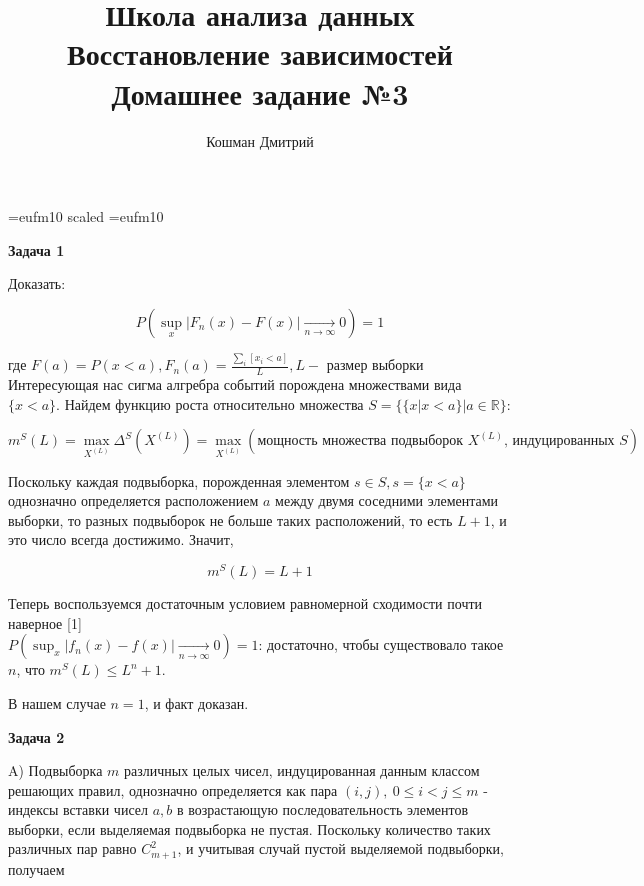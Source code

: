 \documentclass[10pt]{article}
\title{Школа анализа данных\\ Восстановление зависимостей \\Домашнее задание №3}
\author{Кошман Дмитрий}
\date{}
\begin{document}
	
	
	\voffset=-20mm
	\hoffset=-17mm
	\font\Got=eufm10 scaled \font\Got=eufm10
	
	
	\maketitle
	
\bigskip

\textbf{Задача 1}

\medskip

Доказать:

$$P\left(\sup_x \left| F_n(x) -F(x) \right|  \xrightarrow[n\rightarrow \infty]{} 0 \right) = 1$$

где $F(a) = P(x < a), F_n(a) = \frac{\sum_i [x_i < a]}{L}, L - $ размер выборки
\\

Интересующая нас сигма алгребра событий порождена множествами вида $\{x < a\}$. Найдем функцию роста относительно множества $S =\{\{x|x < a\} |a \in \mathbb{R}\}$:

$$m^S(L) = \max_{X^{(L)}}\Delta^S(X^{(L)})  = \max_{X^{(L)}} \left(\text{мощность множества подвыборок $X^{(L)}$, индуцированных $S$}\right)$$ 

Поскольку каждая подвыборка, порожденная элементом $s \in S, s= \{x < a\}$ однозначно определяется расположением $a$ между двумя соседними элементами выборки, то разных подвыборок не больше таких расположений, то есть $L + 1$, и это число всегда достижимо. Значит,

$$m^S(L)  = L + 1$$

Теперь воспользуемся достаточным условием равномерной сходимости почти наверное [1] \\$P\left(\sup_x \left| f_n(x) -f(x) \right|  \xrightarrow[n\rightarrow \infty]{} 0 \right) = 1$: достаточно, чтобы существовало такое $n$, что $m^S(L) \leq L^n + 1 $.

В нашем случае $n=1$, и факт доказан.
	
\bigskip

\textbf{Задача 2}

\medskip 

A) Подвыборка $m$ различных целых чисел, индуцированная данным классом решающих правил, однозначно определяется как пара $(i, j), \medspace 0 \leq i <j \leq m $ - индексы вставки чисел $a, b$ в возрастающую последовательность элементов выборки, если выделяемая подвыборка не пустая. Поскольку количество таких различных пар равно $C_{m+1}^2$, и учитывая случай пустой выделяемой подвыборки, получаем
\end{document}
